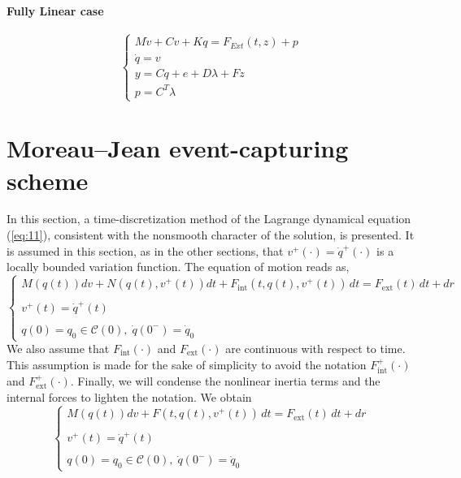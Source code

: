 \paragraph{Fully Linear case}

\begin{equation}
  \label{eq:FullyLinear}
  \begin{cases}
    M \dot v   +C v + Kq = F_{Ext}(t, z) + p  \\
    \dot q = v \\
    y = C q + e + D\lambda  + F z \\
    p = C^T\lambda
  \end{cases}
\end{equation}




\section{Moreau--Jean event-capturing scheme}

In this section, a time-discretization method of the Lagrange dynamical equation (\ref{eq:11}), consistent with the nonsmooth character of the solution, is presented. It is assumed in this section, as in the other sections, that $v^+(\cdot)=\dot{q}^{+}(\cdot)$  is a locally bounded variation function. The equation of motion reads as,
\begin{equation}
  \label{eq:11-b}
  \begin{cases}
    M(q(t)) {dv} +N(q(t),v^{+}(t)) dt+  F_{\mathrm{int}}(t, q(t), v^+(t))\,dt = F_{\mathrm{ext}}(t)\,dt + dr \\ \\
   v^+(t)=\dot{q}^+(t) \\ \\
  q(0)=q_{0} \in {\mathcal C}(0),\;\dot{q}(0^{-})=\dot{q}_{0}
  \end{cases}
\end{equation}
We also assume that $F_{\mathrm{int}}(\cdot)$ and $F_{\mathrm{ext}}(\cdot)$ are continuous with respect to time. This assumption is made for the sake of simplicity to avoid the notation $F^+_{\mathrm{int}}(\cdot)$ and $F^+_{\mathrm{ext}}(\cdot)$. Finally, we will condense the nonlinear inertia terms and the internal forces to lighten the notation. We obtain
\begin{equation}
  \label{eq:11-c}
  \begin{cases}
    M(q(t)) {dv} + F(t, q(t), v^+(t))\,dt = F_{\mathrm{ext}}(t)\,dt + dr \\ \\
   v^+(t)=\dot{q}^+(t) \\ \\
  q(0)=q_{0} \in {\mathcal C}(0),\;\dot{q}(0^{-})=\dot{q}_{0}
  \end{cases}
\end{equation}

